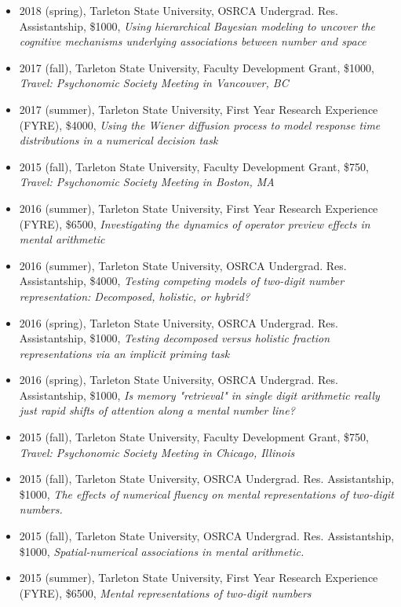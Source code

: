 \documentclass[article,10pt]{article}
\begin{document}
\begin{itemize}
\item 2018 (spring), Tarleton State University, OSRCA Undergrad. Res. Assistantship, \$1000, \emph{Using hierarchical Bayesian modeling to uncover the cognitive mechanisms underlying associations between number and space}
\item 2017 (fall), Tarleton State University, Faculty Development Grant, \$1000, \emph{Travel: Psychonomic Society Meeting in Vancouver, BC}
\item 2017 (summer), Tarleton State University, First Year Research Experience (FYRE), \$4000, \emph{Using the Wiener diffusion process to model response time distributions in a numerical decision task}
\item 2015 (fall), Tarleton State University, Faculty Development Grant, \$750, \emph{Travel: Psychonomic Society Meeting in Boston, MA}
\item 2016 (summer), Tarleton State University, First Year Research Experience (FYRE), \$6500, \emph{Investigating the dynamics of operator preview effects in mental arithmetic}
\item 2016 (summer), Tarleton State University, OSRCA Undergrad. Res. Assistantship, \$4000, \emph{Testing competing models of two-digit number representation: Decomposed, holistic, or hybrid?}
\item 2016 (spring), Tarleton State University, OSRCA Undergrad. Res. Assistantship, \$1000, \emph{Testing decomposed versus holistic fraction representations via an implicit priming task}
\item 2016 (spring), Tarleton State University, OSRCA Undergrad. Res. Assistantship, \$1000, \emph{Is memory "retrieval" in single digit arithmetic really just rapid shifts of attention along a mental number line?}
\item 2015 (fall), Tarleton State University, Faculty Development Grant, \$750, \emph{Travel: Psychonomic Society Meeting in Chicago, Illinois}
\item 2015 (fall), Tarleton State University, OSRCA Undergrad. Res. Assistantship, \$1000, \emph{The effects of numerical fluency on mental representations of two-digit numbers.}
\item 2015 (fall), Tarleton State University, OSRCA Undergrad. Res. Assistantship, \$1000, \emph{Spatial-numerical associations in mental arithmetic.}
\item 2015 (summer), Tarleton State University, First Year Research Experience (FYRE), \$6500, \emph{Mental representations of two-digit numbers}

\end{itemize}
\end{document}

